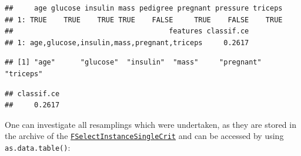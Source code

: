 \documentclass[
]{scrbook}
\newenvironment{Shaded}{\begin{snugshade}}{\end{snugshade}}
\newcommand{\CommentTok}[1]{\textcolor[rgb]{0.56,0.35,0.01}{\textit{#1}}}
\newcommand{\FunctionTok}[1]{\textcolor[rgb]{0.00,0.00,0.00}{#1}}
\newcommand{\NormalTok}[1]{#1}
\newcommand{\SpecialCharTok}[1]{\textcolor[rgb]{0.00,0.00,0.00}{#1}}
\newcommand{\StringTok}[1]{\textcolor[rgb]{0.31,0.60,0.02}{#1}}
\renewenvironment{Shaded} {\begin{snugshade}\small} {\end{snugshade}}
\begin{document}
\begin{Shaded}
\end{Shaded}

\begin{verbatim}
##     age glucose insulin mass pedigree pregnant pressure triceps
## 1: TRUE    TRUE    TRUE TRUE    FALSE     TRUE    FALSE    TRUE
##                                     features classif.ce
## 1: age,glucose,insulin,mass,pregnant,triceps     0.2617
\end{verbatim}

\begin{Shaded}
\end{Shaded}

\begin{verbatim}
## [1] "age"      "glucose"  "insulin"  "mass"     "pregnant" "triceps"
\end{verbatim}

\begin{Shaded}
\end{Shaded}

\begin{verbatim}
## classif.ce 
##     0.2617
\end{verbatim}

One can investigate all resamplings which were undertaken, as they are stored in the archive of the \href{https://mlr3fselect.mlr-org.com/reference/FSelectInstanceSingleCrit.html}{\texttt{FSelectInstanceSingleCrit}} and can be accessed by using \texttt{as.data.table()}:

\begin{Shaded}
\end{Shaded}
\end{document}
